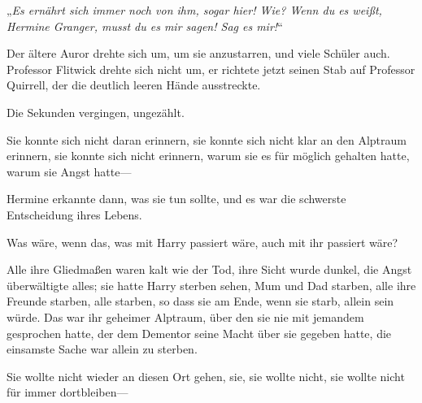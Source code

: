 „\emph{Es ernährt sich immer noch von ihm, sogar hier! Wie? Wenn du es weißt, Hermine Granger, musst du es mir sagen! Sag es mir!}“

Der ältere Auror drehte sich um, um sie anzustarren, und viele Schüler auch. Professor Flitwick drehte sich nicht um, er richtete jetzt seinen Stab auf Professor Quirrell, der die deutlich leeren Hände ausstreckte.

Die Sekunden vergingen, ungezählt.

Sie konnte sich nicht daran erinnern, sie konnte sich nicht klar an den Alptraum erinnern, sie konnte sich nicht erinnern, warum sie es für möglich gehalten hatte, warum sie Angst hatte—

Hermine erkannte dann, was sie tun sollte, und es war die schwerste Entscheidung ihres Lebens.

Was wäre, wenn das, was mit Harry passiert wäre, auch mit ihr passiert wäre?

Alle ihre Gliedmaßen waren kalt wie der Tod, ihre Sicht wurde dunkel, die Angst überwältigte alles; sie hatte Harry sterben sehen, Mum und Dad starben, alle ihre Freunde starben, alle starben, so dass sie am Ende, wenn sie starb, allein sein würde. Das war ihr geheimer Alptraum, über den sie nie mit jemandem gesprochen hatte, der dem Dementor seine Macht über sie gegeben hatte, die einsamste Sache war allein zu sterben.

Sie wollte nicht wieder an diesen Ort gehen, sie, sie wollte nicht, sie wollte nicht für immer dortbleiben—

